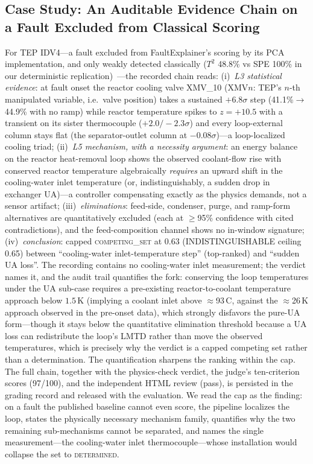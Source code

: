\documentclass[preprint,12pt]{elsarticle}
\begin{document}
\subsection{Case Study: An Auditable Evidence Chain on a Fault Excluded from Classical Scoring}\label{sec:casestudy}
For TEP IDV4---a fault excluded from FaultExplainer's scoring by its PCA implementation, and only weakly detected classically ($T^2$ 48.8\% vs SPE 100\% in our deterministic replication)~\cite{russell2000delay}---the recorded chain reads: (i)~\emph{L3 statistical evidence}: at fault onset the reactor cooling valve XMV\_10 (XMV$n$: TEP's $n$-th manipulated variable, i.e.\ valve position) takes a sustained $+6.8\sigma$ step (41.1\%$\to$44.9\% with no ramp) while reactor temperature spikes to $z{=}{+}10.5$ with a transient on its sister thermocouple ($+2.0/-2.3\sigma$) and every loop-external column stays flat (the separator-outlet column at $-0.08\sigma$)---a loop-localized cooling triad; (ii)~\emph{L5 mechanism, with a necessity argument}: an energy balance on the reactor heat-removal loop shows the observed coolant-flow rise with conserved reactor temperature algebraically \emph{requires} an upward shift in the cooling-water inlet temperature (or, indistinguishably, a sudden drop in exchanger UA)---a controller compensating exactly as the physics demands, not a sensor artifact; (iii)~\emph{eliminations}: feed-side, condenser, purge, and ramp-form alternatives are quantitatively excluded (each at $\ge$95\% confidence with cited contradictions), and the feed-composition channel shows no in-window signature; (iv)~\emph{conclusion}: capped \mbox{\textsc{competing\_set}} at 0.63 (INDISTINGUISHABLE ceiling 0.65) between ``cooling-water inlet-temperature step'' (top-ranked) and ``sudden UA loss''. The recording contains no cooling-water inlet measurement; the verdict names it, and the audit trail quantifies the fork: conserving the loop temperatures under the UA sub-case requires a pre-existing reactor-to-coolant temperature approach below $1.5$\,K (implying a coolant inlet above $\approx$93\,\textdegree C, against the $\approx$26\,K approach observed in the pre-onset data), which strongly disfavors the pure-UA form---though it stays below the quantitative elimination threshold because a UA loss can redistribute the loop's LMTD rather than move the observed temperatures, which is precisely why the verdict is a capped competing set rather than a determination. The quantification sharpens the ranking within the cap. The full chain, together with the physics-check verdict, the judge's ten-criterion scores (97/100), and the independent HTML review (pass), is persisted in the grading record and released with the evaluation. We read the cap as the finding: on a fault the published baseline cannot even score, the pipeline localizes the loop, states the physically necessary mechanism family, quantifies why the two remaining sub-mechanisms cannot be separated, and names the single measurement---the cooling-water inlet thermocouple---whose installation would collapse the set to \mbox{\textsc{determined}}.
\end{document}
